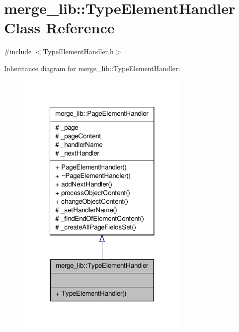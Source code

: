 \hypertarget{classmerge__lib_1_1_type_element_handler}{\section{merge\-\_\-lib\-:\-:Type\-Element\-Handler Class Reference}
\label{d6/d85/classmerge__lib_1_1_type_element_handler}
}


{\ttfamily \#include $<$Type\-Element\-Handler.\-h$>$}



Inheritance diagram for merge\-\_\-lib\-:\-:Type\-Element\-Handler\-:
\nopagebreak
\begin{figure}[H]
\begin{center}
\leavevmode
\includegraphics[width=236pt]{d5/dfa/classmerge__lib_1_1_type_element_handler__inherit__graph}
\end{center}
\end{figure}


